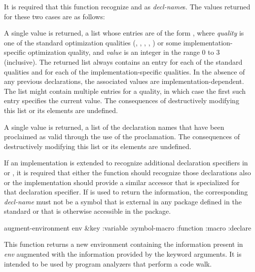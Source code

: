 \begin{newer}
\begin{defun}[Function]
  It is required that this function recognize  and  as
  {\it decl-name\/}s.  The values returned for these two cases are as follows:
\begin{indentdesc}{7pc}
\item[\cd{optimize}]
A single value is returned,
a list whose entries are of the form , where
                {\it quality} is one of the standard optimization qualities
                (, , , , )
                or some implementation-specific optimization quality, and
                {\it value} is an integer in the range 0 to 3 (inclusive).
                The returned list
                always contains an entry for each of the standard qualities and
                for each of the implementation-specific qualities.  In the
                absence of any previous declarations, the associated values are
                implementation-dependent.  The list might contain multiple
                entries for a quality, in which case the first such entry
                specifies the current value.
                The consequences of destructively modifying this list or
		its elements are undefined.
                

\item[\cd{declaration}]
A single value is returned,
a list of the declaration names that have been proclaimed as
                valid through the use of the  proclamation.
                The consequences of destructively modifying this list or
		its elements are undefined.
\end{indentdesc}
  If an implementation is extended to recognize additional
  declaration specifiers in  or , it is required that
  either the  function should recognize those
  declarations also or the implementation should provide a similar accessor that is
  specialized for that declaration specifier.  If 
  is used to return the information, the corresponding {\it decl-name} must not
  be a symbol that is external in any package defined in the standard or
  that is otherwise accessible in the  package.
\end{defun}

\begin{defun}[Function]
augment-environment env &key :variable :symbol-macro :function :macro :declare

  This function returns a new environment containing the information present in
  {\it env} augmented with the information provided by the keyword arguments.  It is
  intended to be used by program analyzers that perform a code walk.


\end{defun}
\end{newer}
